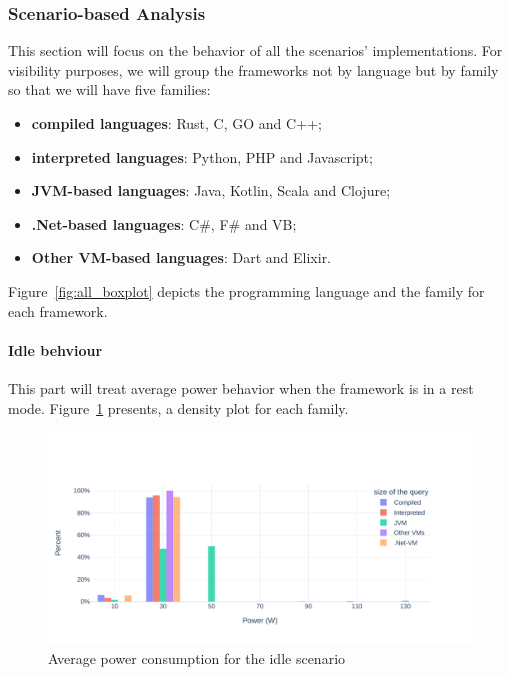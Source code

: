 

\subsubsection{Scenario-based Analysis}
This section will focus on the behavior of all the scenarios' implementations.
For visibility purposes, we will group the frameworks not by language but by family so that we will have five families:
\begin{itemize}
    \item \textbf{compiled languages}: Rust, C, GO and C++;
    \item \textbf{interpreted languages}: Python, PHP and Javascript;
    \item \textbf{JVM-based languages}: Java, Kotlin, Scala and Clojure;
    \item \textbf{.Net-based languages}: C\#, F\# and VB;
    \item \textbf{Other VM-based languages}: Dart and Elixir.
\end{itemize}

Figure~\ref{fig:all_boxplot} depicts the programming language and the family for each framework.

\paragraph{Idle behviour}
This part will treat average power behavior when the framework is in a rest mode.
Figure~\ref{fig:av_power_idle} presents, a density plot for each family.

\begin{figure}[bht]
    \centering
    \includegraphics[width=1.0\columnwidth]{imgs/av_power_idle}
    \caption{Average power consumption for the idle scenario}
    \label{fig:av_power_idle}
\end{figure}

